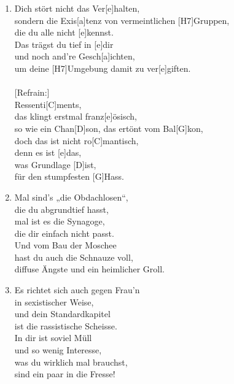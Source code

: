 \def\Titel{Resentiments}
\def\Interpret{YOK (RAK)}
\def\Referenz{text}

\LiedSetup{}

\begin{guitarMagic}
    \begin{enumerate}

        \item Dich stört nicht das Ver[e]halten,\\
            sondern die Exis[a]tenz von vermeintlichen [H7]Gruppen,\\
            die du alle nicht [e]kennst.\\
            Das trägst du tief in [e]dir\\
            und noch and’re Gesch[a]ichten,\\
            um deine [H7]Umgebung damit zu ver[e]giften.\\\ \\

            [Refrain:]\\
            Ressenti[C]ments,\\
            das klingt erstmal franz[e]{ö}sisch,\\
            so wie ein Chan[D]son, das ertönt vom Bal[G]kon,\\
            doch das ist nicht ro[C]mantisch,\\
            denn es ist [e]das,\\
            was Grundlage [D]ist,\\
            für den stumpfesten [G]Hass.

        \item Mal sind’s „die Obdachlosen“,\\
            die du abgrundtief hasst,\\
            mal ist es die Synagoge,\\
            die dir einfach nicht passt.\\
            Und vom Bau der Moschee\\
            hast du auch die Schnauze voll,\\
            diffuse Ängste und ein heimlicher Groll.

        \item Es richtet sich auch gegen Frau’n\\
            in sexistischer Weise,\\
            und dein Standardkapitel\\
            ist die rassistische Scheisse.\\
            In dir ist soviel Müll\\
            und so wenig Interesse,\\
            was du wirklich mal brauchst,\\
            sind ein paar in die Fresse!



\end{enumerate}
\end{guitarMagic}
